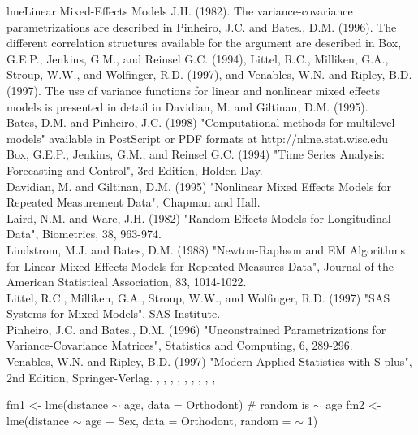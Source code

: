 \documentclass[pdftex]{article} \usepackage{url,graphicx}
\renewcommand{\Twiddle}{\mbox{\(\sim\)}}
\begin{document}
\begin{Helpfile}{lme}{Linear Mixed-Effects Models}
J.H. (1982).  The variance-covariance parametrizations are described in
Pinheiro, J.C. and Bates., D.M.  (1996).   The different correlation
structures available for the  argument are described
in Box, G.E.P., Jenkins, G.M., and Reinsel G.C. (1994), Littel, R.C.,
Milliken, G.A., Stroup, W.W., and Wolfinger, R.D. (1997), and Venables,
W.N. and Ripley, B.D. (1997). The use of variance functions for linear
and nonlinear mixed effects models is presented in detail in Davidian,
M. and Giltinan, D.M. (1995). \\
Bates, D.M. and Pinheiro, J.C. (1998) "Computational methods for
multilevel models" available in PostScript or PDF formats at
http://nlme.stat.wisc.edu \\
Box, G.E.P., Jenkins, G.M., and Reinsel G.C. (1994) "Time Series
Analysis: Forecasting and Control", 3rd Edition, Holden-Day. \\
Davidian, M. and Giltinan, D.M. (1995) "Nonlinear Mixed Effects Models
for Repeated Measurement Data", Chapman and Hall.\\
Laird, N.M. and Ware, J.H. (1982) "Random-Effects Models for
Longitudinal Data", Biometrics, 38, 963-974.  \\
Lindstrom, M.J. and Bates, D.M. (1988) "Newton-Raphson and EM
Algorithms for Linear Mixed-Effects Models for Repeated-Measures
Data", Journal of the American Statistical Association, 83,
1014-1022. \\
Littel, R.C., Milliken, G.A., Stroup, W.W., and Wolfinger, R.D. (1997)
"SAS Systems for Mixed Models", SAS Institute.\\
Pinheiro, J.C. and Bates., D.M.  (1996) "Unconstrained
Parametrizations for Variance-Covariance Matrices", Statistics and
Computing, 6, 289-296.\\
Venables, W.N. and Ripley, B.D. (1997) "Modern Applied Statistics with
S-plus", 2nd Edition, Springer-Verlag.
, ,
, ,
, , ,
, , 
\need 15pt
\vspace{-16pt}
\begin{Example}
fm1 <- lme(distance {\Twiddle} age, data = Orthodont) # random is {\Twiddle} age
fm2 <- lme(distance {\Twiddle} age + Sex, data = Orthodont, random = {\Twiddle} 1)
\end{Example}
\end{Helpfile}
\end{document}
